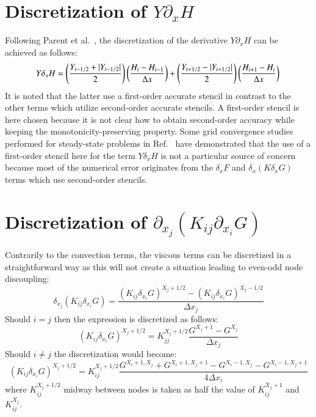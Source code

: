 \documentclass{warpdoc}
\newcommand{\alb}{\vspace{0.2cm}\\} %
\begin{document}
\section{Discretization of $Y \partial_{x} H$}

Following Parent et al.\ \cite{jcp:2013:parent}, the discretization of the derivative $Y \partial_x H$ can be achieved as follows:
%
\begin{equation}
Y \delta_x H = 
  \left(\frac{ Y_{i-1/2} + |Y_{i-1/2}|}{2}\right)\left( \frac{ H_{i} - H_{i-1} }{\Delta x}\right)
+ \left(\frac{ Y_{i+1/2} - |Y_{i+1/2}|}{2}\right)\left( \frac{ H_{i+1} - H_{i} }{\Delta x}\right)\alb
\end{equation}
%
It is noted that the latter use a first-order accurate stencil in contrast to the other terms which utilize second-order accurate stencils. A first-order stencil is here chosen because  it is not clear how to obtain second-order accuracy while keeping the monotonicity-preserving property. Some grid convergence studies performed for steady-state problems in Ref.\ \cite{jcp:2013:parent} have demonstrated that the use of a first-order stencil here for the term $Y\delta_x H$ is not a particular source of concern because most of the numerical error originates from the $\delta_x F$ and $\delta_x(K\delta_x G)$ terms which use second-order stencils.



\section{Discretization of $\partial_{x_j}( K_{ij}  \partial_{x_i}G )$}

Contrarily to the convection terms, the viscous terms can be discretized
in a straightforward way as this will not create
a situation leading to even-odd node discoupling:
%
\begin{equation}
\delta_{x_j}\left( {K_{ij}}\delta_{x_i} G \right)
=\frac{\left( {K_{ij}}\delta_{x_i} G \right)^{X_j+1/2}-
\left({K_{ij}}\delta_{x_i} G \right)^{X_j-1/2} }{\Delta x_j}
\end{equation}
%
Should $i=j$ then the expression is discretized as follows:
%
\begin{equation}
\left( {K_{ij}}\delta_{x_i} G \right)^{X_j+1/2}
=
K_{jj}^{X_j+1/2} \frac{G^{X_j+1}-G^{X_j}}{\Delta x_j}
\end{equation}
% 
Should $i \neq j$ the discretization would become:
%
\begin{equation}
\left( {K_{ij}}\delta_{x_i} G \right)^{X_j+1/2}
   =K_{ij}^{X_j+1/2} 
   \frac{G^{X_i+1,X_j}+G^{X_i+1,X_j+1}
   -G^{X_i-1,X_j}-G^{X_i-1,X_j+1}  }{4 \Delta x_i} 
\end{equation}
%
where $K^{X_j+1/2}_{ij}$ midway between nodes is 
taken as half the value of $K^{X_j+1}_{ij}$ and $K^{X_j}_{ij}$.
\end{document}
